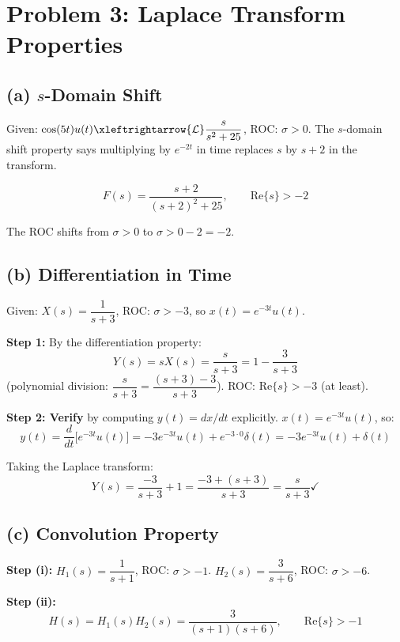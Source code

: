 \documentclass[11pt]{article}
\newcommand{\lt}{\xleftrightarrow{\mathcal{L}}}
\newcommand{\Res}{\mathrm{Re}}
\begin{document}
\section*{Problem 3: Laplace Transform Properties}

\subsection*{(a) $s$-Domain Shift}

Given: $\cos(5t)u(t) \lt \dfrac{s}{s^2+25}$, ROC: $\sigma > 0$. The $s$-domain shift
property says multiplying by $e^{-2t}$ in time replaces $s$ by $s+2$ in the transform.

\begin{equation*}
\boxed{F(s) = \frac{s+2}{(s+2)^2 + 25}, \qquad \Res\{s\} > -2}
\end{equation*}

The ROC shifts from $\sigma > 0$ to $\sigma > 0 - 2 = -2$.

\subsection*{(b) Differentiation in Time}

Given: $X(s) = \dfrac{1}{s+3}$, ROC: $\sigma > -3$, so $x(t) = e^{-3t}u(t)$.

\textbf{Step 1:} By the differentiation property:
\[
Y(s) = sX(s) = \frac{s}{s+3} = 1 - \frac{3}{s+3}
\]
(polynomial division: $\dfrac{s}{s+3} = \dfrac{(s+3)-3}{s+3}$). ROC: $\Res\{s\} > -3$ (at least).

\textbf{Step 2: Verify} by computing $y(t) = dx/dt$ explicitly. $x(t) = e^{-3t}u(t)$, so:
\[
y(t) = \frac{d}{dt}\bigl[e^{-3t}u(t)\bigr] = -3e^{-3t}u(t) + e^{-3\cdot 0}\delta(t) = -3e^{-3t}u(t) + \delta(t)
\]

Taking the Laplace transform:
\[
Y(s) = \frac{-3}{s+3} + 1 = \frac{-3 + (s+3)}{s+3} = \frac{s}{s+3} \checkmark
\]

\subsection*{(c) Convolution Property}

\textbf{Step (i):} $H_1(s) = \dfrac{1}{s+1}$, ROC: $\sigma > -1$. \quad
$H_2(s) = \dfrac{3}{s+6}$, ROC: $\sigma > -6$.

\textbf{Step (ii):}
\[
H(s) = H_1(s)H_2(s) = \frac{3}{(s+1)(s+6)}, \qquad \Res\{s\} > -1
\]
\end{document}
